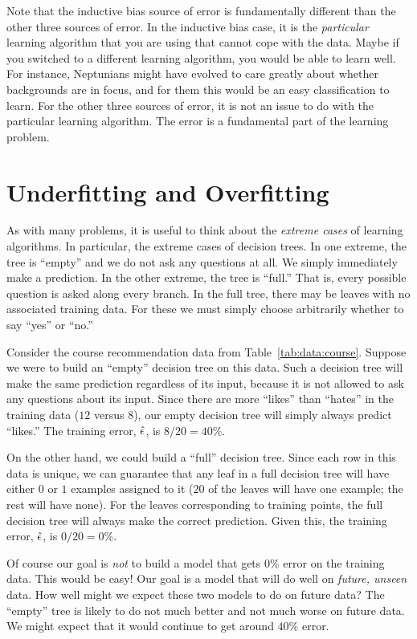 Note that the inductive bias source of error is fundamentally
different than the other three sources of error.  In the inductive
bias case, it is the \emph{particular} learning algorithm that you are
using that cannot cope with the data.  Maybe if you switched to a
different learning algorithm, you would be able to learn well.  For
instance, Neptunians might have evolved to care greatly about whether
backgrounds are in focus, and for them this would be an easy
classification to learn.  For the other three sources of error, it is
not an issue to do with the particular learning algorithm.  The error
is a fundamental part of the learning problem.

\section{Underfitting and Overfitting}

As with many problems, it is useful to think about the \emph{extreme
  cases} of learning algorithms.  In particular, the extreme cases of
decision trees.  In one extreme, the tree is ``empty'' and we do not
ask any questions at all.  We simply immediately make a prediction.  In
the other extreme, the tree is ``full.''  That is, every possible
question is asked along every branch.  In the full tree, there may be
leaves with no associated training data.  For these we must simply
choose arbitrarily whether to say ``yes'' or ``no.''

Consider the course recommendation data from
Table~\ref{tab:data:course}.  Suppose we were to build an ``empty''
decision tree on this data.  Such a decision tree will make the same
prediction regardless of its input, because it is not allowed to ask
any questions about its input.  Since there are more ``likes'' than
``hates'' in the training data ($12$ versus $8$), our empty decision
tree will simply always predict ``likes.''  The training error, $\hat
{\epsilon}$, is $8/20 = 40\%$.

On the other hand, we could build a ``full'' decision tree.  Since
each row in this data is unique, we can guarantee that any leaf in a
full decision tree will have either $0$ or $1$ examples assigned to it
($20$ of the leaves will have one example; the rest will have none).
For the leaves corresponding to training points, the full decision
tree will always make the correct prediction.
Given this, the training error, $\hat {\epsilon}$, is $0/20 = 0\%$.

Of course our goal is \emph{not} to build a model that gets $0\%$
error on the training data.  This would be easy!  Our goal is a model
that will do well on \emph{future, unseen} data.  How well might we
expect these two models to do on future data?  The ``empty'' tree is
likely to do not much better and not much worse on future data.  We
might expect that it would continue to get around $40\%$ error.


